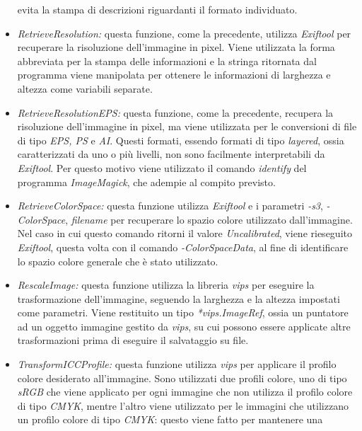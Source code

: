 \begin{itemize}
            evita la stampa di descrizioni riguardanti il formato individuato.
      \item \emph{RetrieveResolution:} questa funzione, come la precedente,
            utilizza \emph{Exiftool} per recuperare la risoluzione dell'immagine in
            pixel. Viene utilizzata la forma abbreviata per la stampa delle informazioni
            e la stringa ritornata dal programma viene manipolata per ottenere le
            informazioni di larghezza e altezza come variabili separate.
      \item \emph{RetrieveResolutionEPS:} questa funzione, come la precedente,
            recupera la risoluzione dell'immagine in pixel, ma viene utilizzata per le
            conversioni di file di tipo \emph{EPS, PS} e \emph{AI}. Questi formati,
            essendo formati di tipo \emph{layered}, ossia caratterizzati da uno o più
            livelli, non sono facilmente interpretabili da \emph{Exiftool}. Per questo
            motivo viene utilizzato il comando \emph{identify} del programma
            \emph{ImageMagick}, che adempie al compito previsto.
      \item \emph{RetrieveColorSpace:} questa funzione utilizza \emph{Exiftool} e
            i parametri \emph{-s3}, \emph{-ColorSpace}, \emph{filename} per recuperare
            lo spazio colore utilizzato dall'immagine. Nel caso in cui questo comando
            ritorni il valore \emph{Uncalibrated}, viene rieseguito \emph{Exiftool},
            questa volta con il comando \emph{-ColorSpaceData}, al fine di identificare
            lo spazio colore generale che è stato utilizzato.
      \item \emph{RescaleImage:} questa funzione utilizza la libreria \emph{vips}
            per eseguire la trasformazione dell'immagine, seguendo la larghezza e la
            altezza impostati come parametri. Viene restituito un tipo
            \emph{*vips.ImageRef}, ossia un puntatore ad un oggetto immagine gestito da
            \emph{vips}, su cui possono essere applicate altre trasformazioni prima di
            eseguire il salvataggio su file.
      \item \emph{TransformICCProfile:} questa funzione utilizza \emph{vips} per
            applicare il profilo colore desiderato all'immagine. Sono utilizzati due
            profili colore, uno di tipo \emph{sRGB} che viene applicato per ogni
            immagine che non utilizza il profilo colore di tipo \emph{CMYK}, mentre l'altro viene utilizzato per le immagini
            che utilizzano
            un profilo colore di tipo \emph{CMYK}: questo viene fatto per mantenere una

\end{itemize}
